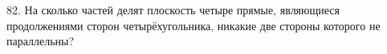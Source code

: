82. На сколько частей делят плоскость четыре прямые, являющиеся продолжениями сторон четырёхугольника, никакие две стороны которого не параллельны?\\
